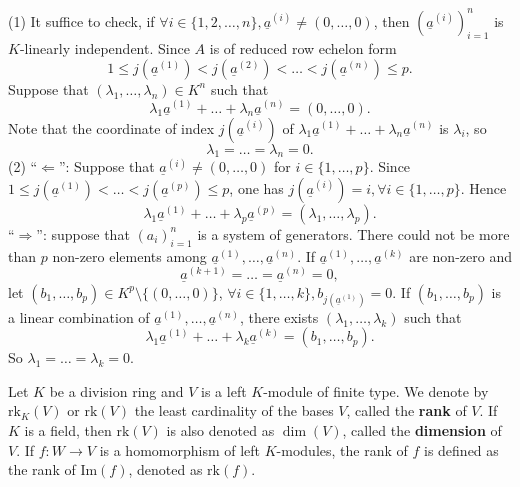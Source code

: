 \begin{proofenv}
    \quad
    \newline
    (1) It suffice to check, if $\forall i\in \{1,2,\dots,n\},\underline{a}^{(i)}\not=(0,\dots,0)$, then $\left(\underline{a}^{(i)}\right)_{i=1}^n$ is $K$-linearly independent.
    Since $A$ is of reduced row echelon form 
    $$1\le j(\underline{a}^{(1)})<j(\underline{a}^{(2)})<\dots<j(\underline{a}^{(n)})\le p.$$
    Suppose that $(\lambda_1,\dots,\lambda_n)\in K^n$ such that 
    $$\lambda_1 \underline{a}^{(1)}+\dots+\lambda_n\underline{a}^{(n)}=(0,\dots,0).$$
    Note that the coordinate of index $j(\underline{a}^{(i)})$ of $\lambda_1 \underline{a}^{(1)}+\dots+\lambda_n\underline{a}^{(n)}$ is $\lambda_i$, so $$\lambda_1=\dots=\lambda_n=0.$$
    (2) ``$\Leftarrow$'': Suppose that $\underline{a}^{(i)}\not=(0,\dots,0)$ for $i\in \{1,\dots,p\}$. Since $1\le j(\underline{a}^{(1)})<\dots< j(\underline{a}^{(p)})\le p$, one has $j(\underline{a}^{(i)})=i, \forall i\in \{1,\dots,p\}$. Hence $$\lambda_1\underline{a}^{(1)}+\dots+\lambda_p\underline{a}^{(p)}=(\lambda_1,\dots,\lambda_p).$$
    ``$\Rightarrow$'': suppose that $(a_i)_{i=1}^n$ is a system of generators. There could not be more than $p$ non-zero elements among $\underline{a}^{(1)},\dots,\underline{a}^{(n)}$. If $\underline{a}^{(1)},\dots,\underline{a}^{(k)}$ are non-zero and 
    $$\underline{a}^{(k+1)}=\dots=\underline{a}^{(n)}=0,$$
    let $(b_1,\dots,b_p)\in K^p\setminus\{(0,\dots,0)\}$, $\forall i\in \{1,\dots,k\}, b_{j(\underline{a}^{(1)})}=0$. If $(b_1,\dots,b_p)$ is a linear combination of $\underline{a}^{(1)},\dots,\underline{a}^{(n)}$, there exists $(\lambda_1,\dots,\lambda_k)$ such that 
    $$\lambda_1\underline{a}^{(1)}+\dots+\lambda_k\underline{a}^{(k)}=(b_1,\dots,b_p).$$
    So $\lambda_1=\dots=\lambda_k=0$.
\end{proofenv}

\begin{definitionenv}
    Let $K$ be a division ring and $V$ is a left $K$-module of finite type. We denote by $\mathrm{rk}_K(V)$ or $\mathrm{rk}(V)$ the least cardinality of the bases $V$, called the \textbf{rank} of $V$. If $K$ is a field, then $\mathrm{rk}(V)$ is also denoted as $\dim(V)$, called the \textbf{dimension} of $V$. If $f:W\longrightarrow V$ is a homomorphism of left $K$-modules, the rank of $f$ is defined as the rank of $\mathrm{Im}(f)$, denoted as $\mathrm{rk}(f)$.
\end{definitionenv}







